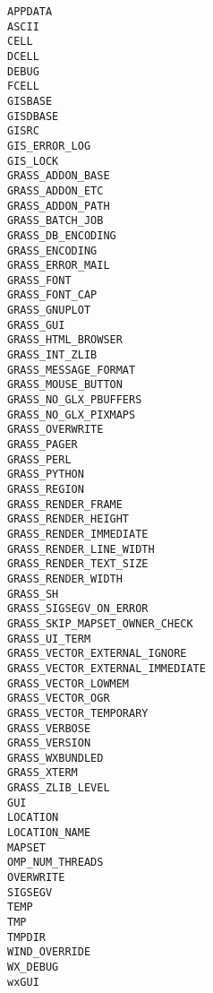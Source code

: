 \begin{lstlisting}
APPDATA
ASCII
CELL
DCELL
DEBUG
FCELL
GISBASE
GISDBASE
GISRC
GIS_ERROR_LOG
GIS_LOCK
GRASS_ADDON_BASE
GRASS_ADDON_ETC
GRASS_ADDON_PATH
GRASS_BATCH_JOB
GRASS_DB_ENCODING
GRASS_ENCODING
GRASS_ERROR_MAIL
GRASS_FONT
GRASS_FONT_CAP
GRASS_GNUPLOT
GRASS_GUI
GRASS_HTML_BROWSER
GRASS_INT_ZLIB
GRASS_MESSAGE_FORMAT
GRASS_MOUSE_BUTTON
GRASS_NO_GLX_PBUFFERS
GRASS_NO_GLX_PIXMAPS
GRASS_OVERWRITE
GRASS_PAGER
GRASS_PERL
GRASS_PYTHON
GRASS_REGION
GRASS_RENDER_FRAME
GRASS_RENDER_HEIGHT
GRASS_RENDER_IMMEDIATE
GRASS_RENDER_LINE_WIDTH
GRASS_RENDER_TEXT_SIZE
GRASS_RENDER_WIDTH
GRASS_SH
GRASS_SIGSEGV_ON_ERROR
GRASS_SKIP_MAPSET_OWNER_CHECK
GRASS_UI_TERM
GRASS_VECTOR_EXTERNAL_IGNORE
GRASS_VECTOR_EXTERNAL_IMMEDIATE
GRASS_VECTOR_LOWMEM
GRASS_VECTOR_OGR
GRASS_VECTOR_TEMPORARY
GRASS_VERBOSE
GRASS_VERSION
GRASS_WXBUNDLED
GRASS_XTERM
GRASS_ZLIB_LEVEL
GUI
LOCATION
LOCATION_NAME
MAPSET
OMP_NUM_THREADS
OVERWRITE
SIGSEGV
TEMP
TMP
TMPDIR
WIND_OVERRIDE
WX_DEBUG
wxGUI
\end{lstlisting}
